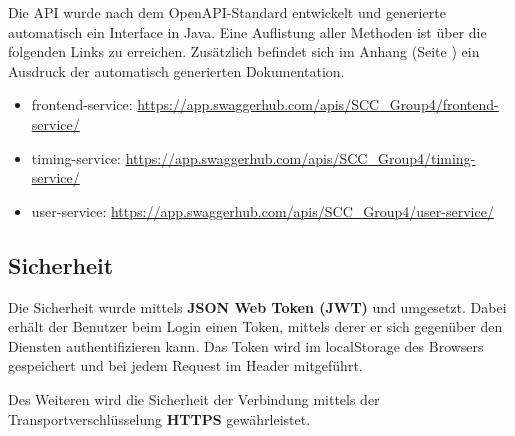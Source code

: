 Die API wurde nach dem OpenAPI-Standard entwickelt und generierte automatisch ein Interface in Java. Eine Auflistung aller Methoden ist über die folgenden Links zu erreichen. Zusätzlich befindet sich im Anhang (Seite \pageref{Anhang}) ein Ausdruck der automatisch generierten Dokumentation.

\begin{itemize}
	\item frontend-service: \newline  \url{https://app.swaggerhub.com/apis/SCC_Group4/frontend-service/}
	\item timing-service: \newline \url{https://app.swaggerhub.com/apis/SCC_Group4/timing-service/}
	\item user-service: \newline \url{https://app.swaggerhub.com/apis/SCC_Group4/user-service/}
\end{itemize}

\subsection{Sicherheit}

Die Sicherheit wurde mittels \textbf{JSON Web Token (JWT)} und umgesetzt. Dabei erhält der Benutzer beim Login einen Token, mittels derer er sich gegenüber den Diensten authentifizieren kann. Das Token wird im localStorage des Browsers gespeichert und bei jedem Request im Header mitgeführt. 

Des Weiteren wird die Sicherheit der Verbindung mittels der Transportverschlüsselung \textbf{HTTPS} gewährleistet. 
